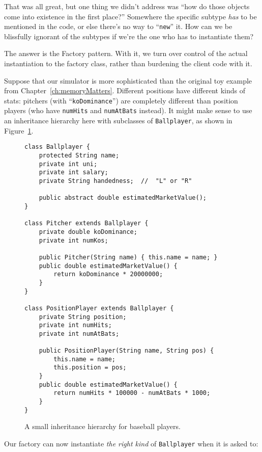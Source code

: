 That was all great, but one thing we didn't address was ``how do those objects
come into existence in the first place?'' Somewhere the specific subtype
\textit{has} to be mentioned in the code, or else there's no way to
``\texttt{new}'' it. How can we be blissfully ignorant of the subtypes if we're
the one who has to instantiate them?

The answer is the Factory pattern. With it, we turn over control of the actual
instantiation to the factory class, rather than burdening the client code with
it.

Suppose that our simulator is more sophisticated than the original toy example
from Chapter~\ref{ch:memoryMatters}. Different positions have different kinds
of stats: pitchers (with ``\texttt{koDominance}'') are completely different
than position players (who have \texttt{numHits} and \texttt{numAtBats}
instead). It might make sense to use an inheritance hierarchy here with
subclasses of \texttt{Ballplayer}, as shown in
Figure~\ref{ballplayerInheritance}.

\begin{figure}[ht]
\begin{Verbatim}[fontsize=\scriptsize,samepage=true,frame=single]
class Ballplayer {
    protected String name;
    private int uni;
    private int salary;
    private String handedness;  //  "L" or "R"

    public abstract double estimatedMarketValue();
}

class Pitcher extends Ballplayer {
    private double koDominance;
    private int numKos;

    public Pitcher(String name) { this.name = name; }
    public double estimatedMarketValue() {
        return koDominance * 20000000;
    }
}

class PositionPlayer extends Ballplayer {
    private String position;
    private int numHits;
    private int numAtBats;

    public PositionPlayer(String name, String pos) {
        this.name = name;
        this.position = pos;
    }
    public double estimatedMarketValue() {
        return numHits * 100000 - numAtBats * 1000;
    }
}
\end{Verbatim}
\caption{A small inheritance hierarchy for baseball players.}
\label{ballplayerInheritance}
\end{figure}

Our factory can now instantiate \textit{the right kind} of \texttt{Ballplayer}
when it is asked to:

